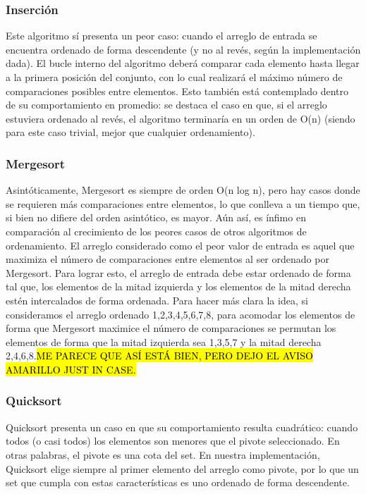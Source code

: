 \documentclass[article,a4paper]{article}
\begin{document}
\subsubsection{Inserción}

Este algoritmo sí presenta un peor caso: cuando el arreglo de entrada se encuentra ordenado de forma descendente (y no al revés, según la implementación dada). El bucle interno del algoritmo deberá comparar cada elemento hasta llegar a la primera posición del conjunto, con lo cual realizará el máximo número de comparaciones posibles entre elementos. Esto también está contemplado dentro de su comportamiento en promedio: se destaca el caso en que, si el arreglo estuviera ordenado al revés, el algoritmo terminaría en un orden de O(n) (siendo para este caso trivial, mejor que cualquier ordenamiento).

\subsubsection{Mergesort}

Asintóticamente, Mergesort es siempre de orden O(n log n), pero hay casos donde se requieren más comparaciones entre elementos, lo que conlleva a un tiempo que, si bien no difiere del orden asintótico, es mayor. Aún así, es ínfimo en comparación al crecimiento de los peores casos de otros algoritmos de ordenamiento. El arreglo considerado como el peor valor de entrada es aquel que maximiza el número de comparaciones entre elementos al ser ordenado por Mergesort. Para lograr esto, el arreglo de entrada debe estar ordenado de forma tal que, los elementos de la mitad izquierda y los elementos de la mitad derecha estén intercalados de forma ordenada. Para hacer más clara la idea, si consideramos el arreglo ordenado {1,2,3,4,5,6,7,8}, para acomodar los elementos de forma que Mergesort maximice el número de comparaciones se permutan los elementos de forma que la mitad izquierda sea {1,3,5,7} y la mitad derecha {2,4,6,8}.\hl{ME PARECE QUE ASÍ ESTÁ BIEN, PERO DEJO EL AVISO AMARILLO JUST IN CASE.}

\subsubsection{Quicksort}

Quicksort presenta un caso en que su comportamiento resulta cuadrático: cuando todos (o casi todos) los elementos son  menores que el pivote seleccionado. En otras palabras, el pivote es una cota del set. En nuestra implementación, Quicksort elige siempre al primer elemento del arreglo como pivote, por lo que un set que cumpla con estas características es uno ordenado de forma  descendente.
\end{document}
